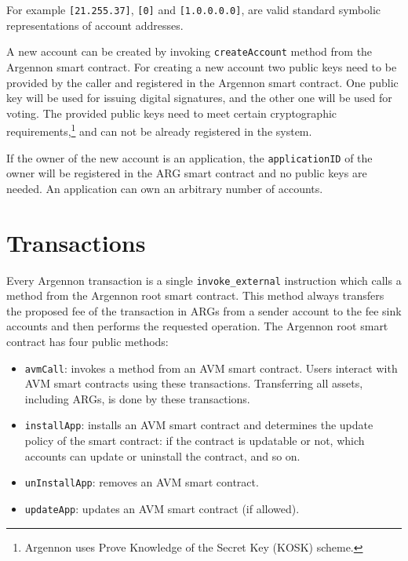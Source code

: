 For example \texttt{[21.255.37]}, \texttt{[0]} and \texttt{[1.0.0.0.0]}, are valid standard symbolic representations
of account addresses.

A new account can be created by invoking \texttt{createAccount} method from the Argennon smart contract. For creating
a new account two public keys need to be provided by the caller and registered in the Argennon smart contract.
One public key will be used for issuing digital signatures, and the other one will be used for voting. The
provided public keys need to meet certain cryptographic requirements,\footnote{Argennon uses Prove
Knowledge of the Secret Key (KOSK) scheme.} and can not be already registered in the system.

If the owner of the new account is an application, the \texttt{applicationID} of the owner will be registered in the
ARG smart contract and no public keys are needed. An application can own an arbitrary number of accounts.


\section{Transactions}\label{sec:transactions}

Every Argennon transaction is a single \texttt{invoke\_external} instruction which calls a method from the Argennon
root smart contract. This method always transfers the proposed fee of the transaction in ARGs from a
sender account to the fee sink accounts and then performs the requested operation. The Argennon root smart contract
has four public methods:

\begin{itemize}
    \item \texttt{avmCall}: invokes a method from an
    AVM smart contract. Users interact with AVM smart contracts using these transactions. Transferring all
    assets, including ARGs, is done by these transactions.
    \item \texttt{installApp}: installs an AVM smart contract and determines the update policy of the smart
    contract: if the contract is updatable or not, which accounts can update or uninstall the contract, and so
    on.
    \item \texttt{unInstallApp}: removes an AVM smart contract.
    \item \texttt{updateApp}: updates an AVM smart contract (if allowed).
\end{itemize}

